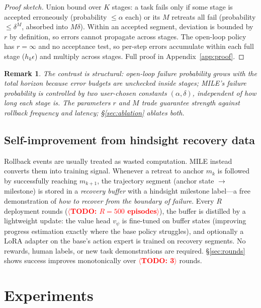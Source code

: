 \documentclass{article}
\newcommand{\mile}{\textsc{MILE}}
\newcommand{\TODO}[1]{\textcolor{red}{\textbf{$\langle$TODO: #1$\rangle$}}}
\newtheorem{remark}{Remark}
\begin{document}
\begin{proof}[Proof sketch]
Union bound over $K$ stages: a task fails only if some stage is accepted erroneously (probability $\le \alpha$ each) or its $M$ retreats all fail (probability $\le \delta^M$, absorbed into $M\delta$). Within an accepted segment, deviation is bounded by $r$ by definition, so errors cannot propagate across stages. The open-loop policy has $r = \infty$ and no acceptance test, so per-step errors accumulate within each full stage ($h_k \epsilon$) and multiply across stages. Full proof in Appendix~\ref{app:proof}.
\end{proof}

\begin{remark}
The contrast is structural: open-loop failure probability grows with the \emph{total} horizon because error budgets are unchecked inside stages; \mile{}'s failure probability is controlled by two \emph{user-chosen} constants $(\alpha, \delta)$, independent of how long each stage is. The parameters $r$ and $M$ trade guarantee strength against rollback frequency and latency; \S\ref{sec:ablation} ablates both.
\end{remark}

\subsection{Self-improvement from hindsight recovery data}
\label{sec:selfimprove}

Rollback events are usually treated as wasted computation. \mile{} instead converts them into training signal. Whenever a retreat to anchor $m_k$ is followed by successfully reaching $m_{k+1}$, the trajectory segment (anchor state $\rightarrow$ milestone) is stored in a \emph{recovery buffer} with a hindsight milestone label---a free demonstration of \emph{how to recover from the boundary of failure}. Every $R$ deployment rounds (\TODO{$R{=}500$ episodes}), the buffer is distilled by a lightweight update: the value head $v_\psi$ is fine-tuned on buffer states (improving progress estimation exactly where the base policy struggles), and optionally a LoRA adapter on the base's action expert is trained on recovery segments. No rewards, human labels, or new task demonstrations are required. \S\ref{sec:rounds} shows success improves monotonically over \TODO{3} rounds.

\section{Experiments}
\label{sec:exp}
\end{document}
